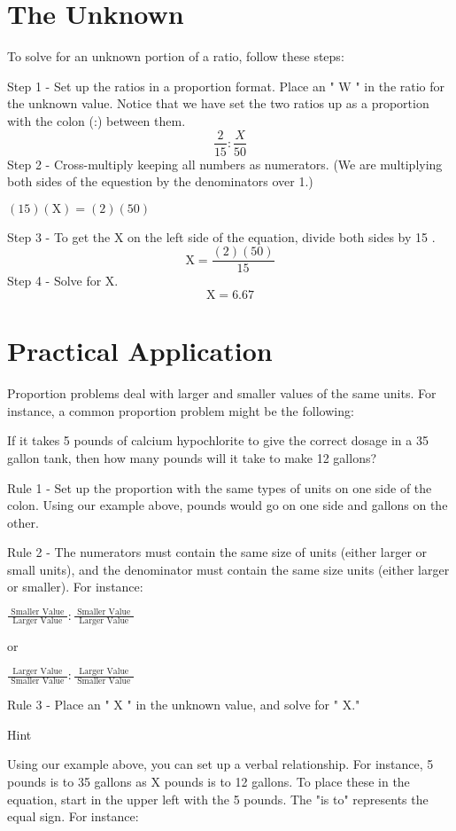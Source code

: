 \section{The Unknown}
To solve for an unknown portion of a ratio, follow these steps:

Step 1 - Set up the ratios in a proportion format. Place an " $\mathrm{W}$ " in the ratio for the unknown value. Notice that we have set the two ratios up as a proportion with the colon (:) between them.
$$
\frac{2}{15}: \frac{X}{50}
$$
Step 2 - Cross-multiply keeping all numbers as numerators. (We are multiplying both sides of the equestion by the denominators over 1.)

$(15)(\mathrm{X})=(2)(50)$

Step 3 - To get the $\mathrm{X}$ on the left side of the equation, divide both sides by 15 .
$$
\mathrm{X}=\frac{(2)(50)}{15}
$$
Step 4 - Solve for X.
$$
\mathrm{X}=6.67
$$

\section{Practical Application}
Proportion problems deal with larger and smaller values of the same units. For instance, a common proportion problem might be the following:

If it takes 5 pounds of calcium hypochlorite to give the correct dosage in a 35 gallon tank, then how many pounds will it take to make 12 gallons?

Rule 1 - Set up the proportion with the same types of units on one side of the colon. Using our example above, pounds would go on one side and gallons on the other.

Rule 2 - The numerators must contain the same size of units (either larger or small units), and the denominator must contain the same size units (either larger or smaller). For instance:

$\frac{\text { Smaller Value }}{\text { Larger Value }}: \frac{\text { Smaller Value }}{\text { Larger Value }}$

or

$\frac{\text { Larger Value }}{\text { Smaller Value }}: \frac{\text { Larger Value }}{\text { Smaller Value }}$

Rule 3 - Place an " $\mathrm{X}$ " in the unknown value, and solve for " $\mathrm{X}$."

Hint

Using our example above, you can set up a verbal relationship. For instance, 5 pounds is to 35 gallons as $\mathrm{X}$ pounds is to 12 gallons. To place these in the equation, start in the upper left with the 5 pounds. The "is to" represents the equal sign. For instance:

